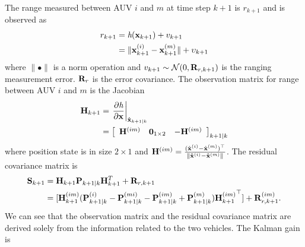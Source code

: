 The range measured between AUV $i$ and $m$ at time step $k+1$ is $r_{k+1}$ and is observed as
 \begin{align}
\begin{split} \label{eq:ranging}
r_{k+1}&=\emph{h}({\bf x}_{k+1})+v_{k+1}\\
&=\|{\bf x}^{(i)}_{k+1}-{\bf x}^{(m)}_{k+1}\|+\upsilon_{k+1}
\end{split}
\end{align}
where $\|\bullet\|$ is a norm operation and $v_{k+1}\sim\mathcal{N}(0,{\bf R}_{r,k+1})$ is the ranging measurement error. ${\bf R}_r$ is the error covariance. The observation matrix for range between AUV $i$ and $m$ is the Jacobian
 \begin{align}
\begin{split}
{\bf H}_{k+1}&=\left.\frac{\partial \emph h}{\partial \bf x}\right\vert_{{\bf \hat x}_{k+1|k}} \\
            &=\left[
              \begin{array}{ccc}
              {\bf H}^{(im)} & \mathbf{0}_{1\times 2} & -{\bf H}^{(im)} \\
              \end{array}
            \right]_{k+1|k}
\label{fig:H}
\end{split}
\end{align}
where position state is in size $2\times 1$ and ${\bf H}^{(im)}=\frac{({\hat{\bf x}}^{(i)}-{\hat{\bf x}}^{(m)})^\top}{\|{\bf \hat x}^{(i)}-{\bf \hat x}^{(m)}\|}$. The residual covariance matrix is %
 \begin{align}
\begin{split}
{\bf S}_{k+1}&={\bf H}_{k+1}{\bf P}_{k+1|k}{\bf H}_{k+1}^T+{\bf R}_{r,k+1}\\
&=[{\bf H}_{k+1}^{(im)}({\bf P}_{k+1|k}^{(i)}-{\bf P}_{k+1|k}^{(mi)}-{\bf P}_{k+1|k}^{(im)}+{\bf P}_{k+1|k}^{(m)}){{\bf H}_{k+1}^{(im)} }^\top]+{\bf R}_{r,k+1}^{(im)}.
\end{split}
\end{align}
We can see that the observation matrix and the residual covariance matrix are derived solely from the information related to the two vehicles. The Kalman gain is
